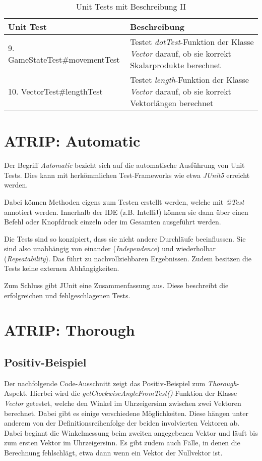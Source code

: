 \begin{table}[H]
    \centering
    \begin{tabular}{|p{8cm}|p{8cm}|}
      \hline
      \textbf{Unit Test} & \textbf{Beschreibung} \\
      \hline
      9. GameStateTest\#movementTest & Testet \textit{dotTest}-Funktion der Klasse \textit{Vector} darauf, ob sie korrekt Skalarprodukte berechnet \\
      \hline
      10. VectorTest\#lengthTest & Testet \textit{length}-Funktion der Klasse \textit{Vector} darauf, ob sie korrekt Vektorlängen berechnet \\
      \hline
    \end{tabular}
    \caption{Unit Tests mit Beschreibung II}
\end{table}

\section{ATRIP: Automatic}
Der Begriff \textit{Automatic} bezieht sich auf die automatische
Ausführung von Unit Tests. Dies kann mit herkömmlichen Test-Frameworks
wie etwa \textit{JUnit5} erreicht werden. 

Dabei können Methoden eigens zum Testen erstellt werden, welche mit
\textit{@Test} annotiert werden. Innerhalb der IDE (z.B. IntelliJ)
können sie dann über einen Befehl oder Knopfdruck einzeln oder im
Gesamten ausgeführt werden.

Die Tests sind so konzipiert, dass sie nicht andere Durchläufe beeinflussen.
Sie sind also unabhängig von einander (\textit{Independence}) und 
wiederholbar (\textit{Repeatability}). Das führt zu nachvollziehbaren
Ergebnissen. Zudem besitzen die Tests keine externen Abhängigkeiten.

Zum Schluss gibt JUnit eine Zusammenfassung aus. Diese beschreibt die
erfolgreichen und fehlgeschlagenen Tests.

\section{ATRIP: Thorough}
\subsection*{Positiv-Beispiel}
Der nachfolgende Code-Ausschnitt zeigt das Positiv-Beispiel zum
\textit{Thorough}-Aspekt. Hierbei wird die
\textit{getClockwiseAngleFromTest()}-Funktion der Klasse
\textit{Vector} getestet, welche den Winkel im Uhrzeigersinn 
zwischen zwei Vektoren berechnet. Dabei gibt es einige verschiedene
Möglichkeiten. Diese hängen unter anderem von der Definitionsreihenfolge
der beiden involvierten Vektoren ab. Dabei beginnt die Winkelmessung
beim zweiten angegebenen Vektor und läuft bis zum ersten Vektor im
Uhrzeigersinn. Es gibt zudem auch Fälle, in denen die Berechnung
fehlschlägt, etwa dann wenn ein Vektor der Nullvektor ist.

